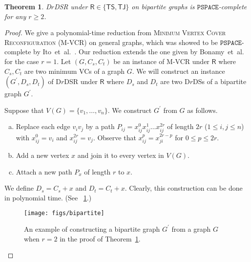 \documentclass[a4paper]{article}
\theoremstyle{plain}
\newtheorem{theorem}{Theorem}
\theoremstyle{definition}
\newcommand{\sfTS}{{\mathsf{TS}}} %
\newcommand{\sfTJ}{{\mathsf{TJ}}} %
\newcommand{\sfR}{{\mathsf{R}}} %
\newcommand{\ttPSPACE}{{\mathtt{PSPACE}}}
\begin{document}
\begin{theorem}\label{thm:bipartite}
	\textsc{D$r$DSR} under $\sfR \in \{\sfTS, \sfTJ\}$ on bipartite graphs is $\ttPSPACE$-complete for any $r \geq 2$.
\end{theorem}
\begin{proof}
	We give a polynomial-time reduction from \textsc{Minimum Vertex Cover Reconfiguration (M-VCR)} on general graphs, which was showed to be $\ttPSPACE$-complete by Ito~et~al.~\cite{ItoDHPSUU11}.
	Our reduction extends the one given by Bonamy~et~al.~\cite{BonamyDO21} for the case $r = 1$.
	Let $(G, C_s, C_t)$ be an instance of \textsc{M-VCR} under $\sfR$ where $C_s, C_t$ are two minimum VCs of a graph $G$.
	We will construct an instance $(G^\prime, D_s, D_t)$ of \textsc{D$r$DSR} under $\sfR$ where $D_s$ and $D_t$ are two D$r$DSs of a bipartite graph $G^\prime$.
	
	Suppose that $V(G) = \{v_1, \dots, v_n\}$.
	We construct $G^\prime$ from $G$ as follows.
	\begin{enumerate}[(a)]
		\item Replace each edge $v_iv_j$ by a path $P_{ij} = x_{ij}^0x_{ij}^1\dots x_{ij}^{2r}$ of length $2r$ ($1 \leq i, j \leq n$) with $x_{ij}^0 = v_i$ and $x_{ij}^{2r} = v_j$. 
		Observe that $x_{ij}^p = x_{ji}^{2r - p}$ for $0 \leq p \leq 2r$.
		\item Add a new vertex $x$ and join it to every vertex in $V(G)$.
		\item Attach a new path $P_x$ of length $r$ to $x$.
	\end{enumerate}
	We define $D_s = C_s + x$ and $D_t = C_t + x$.
	Clearly, this construction can be done in polynomial time.
	(See \figurename~\ref{fig:bipartite}.)
	
	\begin{figure}[ht]
		\centering
		\texttt{[image: figs/bipartite]}
		\caption{An example of constructing a bipartite graph $G^\prime$ from a graph $G$ when $r = 2$ in the proof of Theorem~\ref{thm:bipartite}.}
		\label{fig:bipartite}
	\end{figure}
	

\end{proof}
\end{document}
